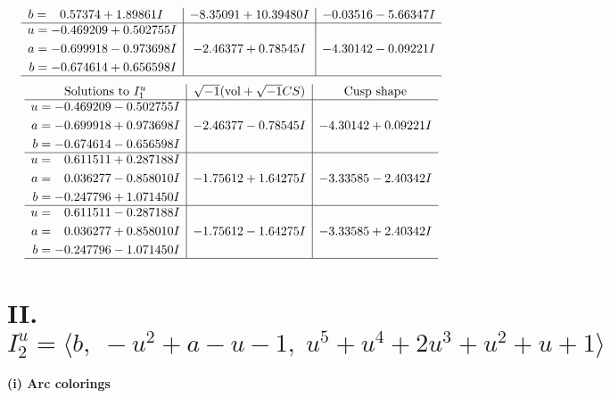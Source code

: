 \documentclass[1p]{elsarticle_modified}
\theoremstyle{definition}
\newcommand{\I}{\sqrt{-1}}
\begin{document}
$$\begin{array}{c|c|c}
\begin{aligned}
b &= \phantom{-}0.57374 + 1.89861 I\end{aligned}
 & -8.35091 + 10.39480 I & -0.03516 - 5.66347 I \\ \hline\begin{aligned}
u &= -0.469209 + 0.502755 I \\
a &= -0.699918 - 0.973698 I \\
b &= -0.674614 + 0.656598 I\end{aligned}
 & -2.46377 + 0.78545 I & -4.30142 - 0.09221 I\\
 \hline 
 \end{array}$$\newpage$$\begin{array}{c|c|c}  
\text{Solutions to }I^u_{1}& \I (\text{vol} + \sqrt{-1}CS) & \text{Cusp shape}\\
 \hline 
\begin{aligned}
u &= -0.469209 - 0.502755 I \\
a &= -0.699918 + 0.973698 I \\
b &= -0.674614 - 0.656598 I\end{aligned}
 & -2.46377 - 0.78545 I & -4.30142 + 0.09221 I \\ \hline\begin{aligned}
u &= \phantom{-}0.611511 + 0.287188 I \\
a &= \phantom{-}0.036277 - 0.858010 I \\
b &= -0.247796 + 1.071450 I\end{aligned}
 & -1.75612 + 1.64275 I & -3.33585 - 2.40342 I \\ \hline\begin{aligned}
u &= \phantom{-}0.611511 - 0.287188 I \\
a &= \phantom{-}0.036277 + 0.858010 I \\
b &= -0.247796 - 1.071450 I\end{aligned}
 & -1.75612 - 1.64275 I & -3.33585 + 2.40342 I\\
 \hline 
 \end{array}$$\newpage\newpage\renewcommand{\arraystretch}{1}
\centering \section*{II. $I^u_{2}= \langle b,\;- u^2+a- u-1,\;u^5+u^4+2 u^3+u^2+u+1 \rangle$}
\flushleft \textbf{(i) Arc colorings}\\
\end{document}
